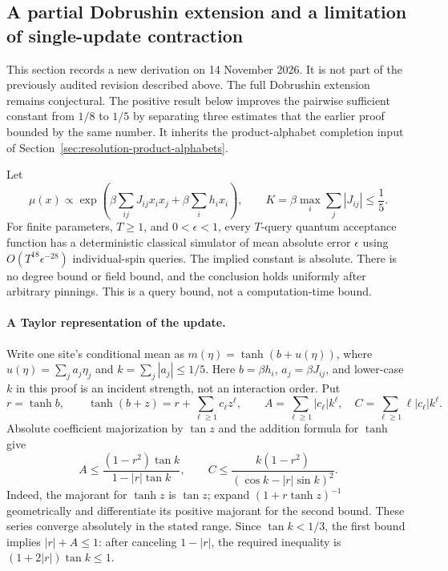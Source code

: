 \subsection{A partial Dobrushin extension and a limitation of single-update contraction}
\label{resolution-dynamics:dobrushin-attempt}

This section records a new derivation on 14 November 2026. It is not
part of the previously audited revision described above. The full
Dobrushin extension remains conjectural. The positive result below
improves the pairwise sufficient constant from $1/8$ to $1/5$ by
separating three estimates that the earlier proof bounded by the same
number. It inherits the product-alphabet completion input of
Section~\ref{sec:resolution-product-alphabets}.

\begin{theorem}
\label{thm:dobrushin-partial-one-fifth}
Let
\[
 \mu(x)\propto\exp\left(\beta\sum_{ij}J_{ij}x_ix_j
                         +\beta\sum_i h_ix_i\right),\qquad
 K=\beta\max_i\sum_j|J_{ij}|\le\frac15.
\]
For finite parameters, $T\ge1$, and $0<\epsilon<1$, every $T$-query quantum acceptance function
has a deterministic classical simulator of mean absolute error
$\epsilon$ using $O(T^{18}\epsilon^{-28})$ individual-spin queries.
The implied constant is absolute. There is no degree bound or field
bound, and the conclusion holds uniformly after arbitrary pinnings.
This is a query bound, not a computation-time bound.
\end{theorem}

\paragraph{A Taylor representation of the update.}
Write one site's conditional mean as
$m(\eta)=\tanh(b+u(\eta))$, where
$u(\eta)=\sum_j a_j\eta_j$ and $k=\sum_j|a_j|\le1/5$.
Here $b=\beta h_i$, $a_j=\beta J_{ij}$, and lower-case $k$ in this
proof is an incident strength, not an interaction order. Put
\[
 r=\tanh b,\qquad
 \tanh(b+z)=r+\sum_{\ell\ge1}c_\ell z^\ell,\qquad
 A=\sum_{\ell\ge1}|c_\ell|k^\ell,\quad
 C=\sum_{\ell\ge1}\ell|c_\ell|k^\ell.
\]
Absolute coefficient majorization by $\tan z$ and the addition
formula for $\tanh$ give
\[
 A\le\frac{(1-r^2)\tan k}{1-|r|\tan k},\qquad
 C\le\frac{k(1-r^2)}{(\cos k-|r|\sin k)^2}.             \tag{DT1}
\]
Indeed, the majorant for $\tanh z$ is $\tan z$; expand
$(1+r\tanh z)^{-1}$ geometrically and differentiate its positive
majorant for the second bound. These series converge absolutely in
the stated range. Since $\tan k<1/3$, the first bound implies
$|r|+A\le1$: after canceling $1-|r|$, the required inequality is
$(1+2|r|)\tan k\le1$.

